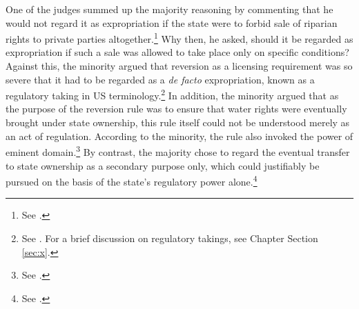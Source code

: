One of the judges summed up the majority reasoning by commenting that he would not regard it as expropriation if the state were to forbid sale of riparian rights to private parties altogether.\footnote{See \cite[407]{johansen18}.} Why then, he asked, should it be regarded as expropriation if such a sale was allowed to take place only on specific conditions? Against this, the minority argued that reversion as a licensing requirement was so severe that it had to be regarded as a {\it de facto} expropriation, known as a regulatory taking in US terminology.\footnote{See \cite[412-413]{johansen18}. For a brief discussion on regulatory takings, see Chapter \cite{chap:1} Section \ref{sec:x}.} In addition, the minority argued that as the purpose of the reversion rule was to ensure that water rights were eventually brought under state ownership, this rule itself could not be understood merely as an act of regulation. According to the minority, the rule also invoked the power of eminent domain.\footnote{See \cite[415-416]{johansen18}.} By contrast, the majority chose to regard the eventual transfer to state ownership as a secondary purpose only, which could justifiably be pursued on the basis of the state's regulatory power alone.\footnote{See \cite[407]{johansen18}.}

